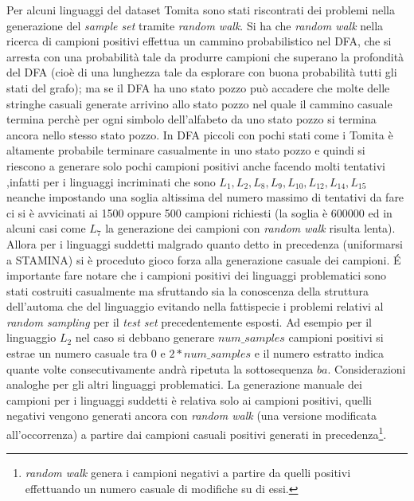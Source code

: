  Per alcuni linguaggi del dataset Tomita  sono stati riscontrati dei problemi nella generazione del \textit{sample set} tramite \textit{random walk}. Si ha che \textit{random walk} nella ricerca di campioni positivi effettua un cammino probabilistico nel \ac{DFA}, che si arresta con una probabilità tale da produrre campioni che superano la profondità del \ac{DFA} (cioè di una lunghezza tale da esplorare con buona probabilità tutti gli stati del grafo); ma se il \ac{DFA} ha uno stato pozzo può accadere che molte delle stringhe casuali generate arrivino allo stato pozzo nel quale il cammino casuale termina perchè per ogni simbolo dell'alfabeto da uno stato pozzo si termina ancora nello stesso stato pozzo. In \ac{DFA} piccoli con pochi stati come i Tomita è altamente probabile terminare casualmente in uno stato pozzo e quindi si riescono a  generare solo pochi campioni positivi anche facendo molti tentativi ,infatti per i linguaggi incriminati che sono $L_1,L_2,L_8,L_9,L_{10},L_{12},L_{14},L_{15}$ neanche impostando una soglia altissima del numero massimo di tentativi  da fare  ci si è avvicinati ai 1500 oppure 500 campioni richiesti (la soglia è 600000 ed in alcuni casi come $L_7$ la generazione dei campioni con \textit{random walk} risulta lenta). Allora per i linguaggi suddetti malgrado quanto detto in precedenza (uniformarsi a STAMINA) si è proceduto gioco forza alla generazione casuale dei campioni. \'E importante fare notare che  i campioni positivi dei linguaggi problematici sono stati costruiti casualmente ma sfruttando sia la conoscenza della struttura dell'automa che del linguaggio evitando nella fattispecie i problemi relativi al  \textit{random sampling} per il \textit{test set} precedentemente esposti.  Ad esempio per il linguaggio $L_2$ nel caso si debbano generare $num\_samples$ campioni positivi si estrae un numero casuale tra $0$ e $2*num\_samples$ e il numero estratto indica quante volte consecutivamente andrà ripetuta la sottosequenza  $ba$. Considerazioni analoghe per gli altri linguaggi problematici. La generazione manuale dei campioni per i linguaggi suddetti è relativa solo ai campioni positivi, quelli negativi vengono generati ancora con \textit{random walk} (una versione modificata all'occorrenza) a partire dai campioni casuali positivi generati in precedenza\footnote{\textit{random walk} genera i campioni negativi a partire da quelli positivi effettuando un numero casuale di modifiche su di essi.}.
 
